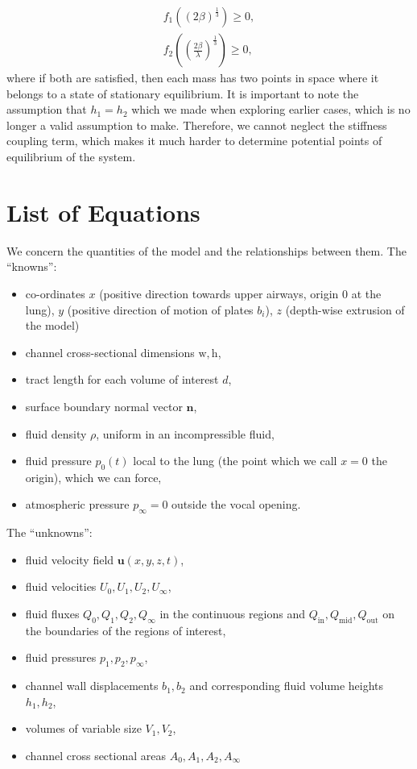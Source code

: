 \documentclass{article}
\begin{document}
\begin{align*}
    f_1 \left( (2\beta)^\frac{1}{3} \right) \ge 0, \\
    f_2 \left( \left( \frac{2\beta}{\lambda} \right)^\frac{1}{3} \right) \ge 0,
\end{align*}
where if both are satisfied, then each mass has two points in space where it belongs to a state of stationary equilibrium.
It is important to note the assumption that \(h_1=h_2\) which we made when exploring earlier cases,
which is no longer a valid assumption to make. 
Therefore, we cannot neglect the stiffness coupling term,
which makes it much harder to determine potential points of equilibrium of the system.


\section{List of Equations}

We concern the quantities of the model and the relationships between them. The ``knowns'':

\begin{itemize}
    \item co-ordinates $x$ (positive direction towards upper airways, origin $0$ at the lung), $y$ (positive direction of motion of plates $b_i$), $z$ (depth-wise extrusion of the model)
    \item channel cross-sectional dimensions $\mathrm{w,h}$,
    \item tract length for each volume of interest $d$,
    \item surface boundary normal vector $\mathbf{n}$,
    \item fluid density $\rho$, uniform in an incompressible fluid,
    \item fluid pressure $p_0(t)$ local to the lung (the point which we call $x=0$ the origin), which we can force,
    \item atmospheric pressure $p_\infty = 0$ outside the vocal opening.
\end{itemize}

The ``unknowns'':

\begin{itemize}
    \item fluid velocity field $\mathbf{u}(x,y,z,t)$, %
    \item fluid velocities $U_0, U_1, U_2, U_\infty$,
    \item fluid fluxes $Q_0, Q_1, Q_2, Q_\infty$ in the continuous regions and $Q_\mathrm{in}, Q_\mathrm{mid}, Q_\mathrm{out}$ on the boundaries of the regions of interest,
    \item fluid pressures $p_1, p_2, p_\infty$,
    \item channel wall displacements $b_1, b_2$ and corresponding fluid volume heights $h_1, h_2$,
    \item volumes of variable size $V_1, V_2$,
    \item channel cross sectional areas $A_0, A_1, A_2, A_\infty$
\end{itemize}
\end{document}
